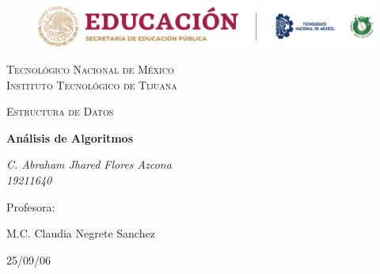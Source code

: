 \documentclass[letterpaper, 12pt]{article}
\begin{document}
    
    \begin{titlepage}
        \begin{figure}[ht]
            \centering
            \includegraphics[width=15cm]{logosITT.png}
        \end{figure}
        \centering
        {\scshape\LARGE Tecnológico Nacional de México\\Instituto Tecnológico de Tijuana\par}
        \vspace{1cm}
        {\scshape\Large Estructura de Datos\par}
        \vspace{1.5cm}
        {\huge\bfseries Análisis de Algoritmos\par}
        \vspace{2cm}
        {\Large\itshape C. Abraham Jhared Flores Azcona\\19211640\par}
        \vfill
        Profesora: \par
        M.C. Claudia Negrete Sanchez
    
        \vfill

        {\large 25/09/06}
    \end{titlepage}

    \newpage
        \thispagestyle{empty}
        \tableofcontents
\end{document}
